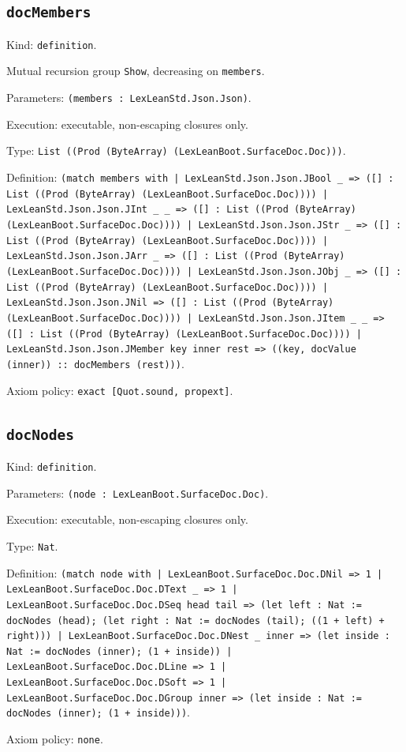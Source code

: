 \documentclass[11pt]{article}
\begin{document}
\subsection*{\texttt{docMembers}}
\noindent Kind: \texttt{definition}.\par
\noindent Mutual recursion group \texttt{Show}, decreasing on \texttt{members}.\par
\noindent Parameters: \texttt{(members : LexLeanStd.Json.Json)}.\par
\noindent Execution: executable, non-escaping closures only.\par
\noindent Type: \texttt{List ((Prod (ByteArray) (LexLeanBoot.SurfaceDoc.Doc)))}.\par
\noindent Definition: \texttt{(match members with | LexLeanStd.Json.Json.JBool \_ => ([] : List ((Prod (ByteArray) (LexLeanBoot.SurfaceDoc.Doc)))) | LexLeanStd.Json.Json.JInt \_ \_ => ([] : List ((Prod (ByteArray) (LexLeanBoot.SurfaceDoc.Doc)))) | LexLeanStd.Json.Json.JStr \_ => ([] : List ((Prod (ByteArray) (LexLeanBoot.SurfaceDoc.Doc)))) | LexLeanStd.Json.Json.JArr \_ => ([] : List ((Prod (ByteArray) (LexLeanBoot.SurfaceDoc.Doc)))) | LexLeanStd.Json.Json.JObj \_ => ([] : List ((Prod (ByteArray) (LexLeanBoot.SurfaceDoc.Doc)))) | LexLeanStd.Json.Json.JNil => ([] : List ((Prod (ByteArray) (LexLeanBoot.SurfaceDoc.Doc)))) | LexLeanStd.Json.Json.JItem \_ \_ => ([] : List ((Prod (ByteArray) (LexLeanBoot.SurfaceDoc.Doc)))) | LexLeanStd.Json.Json.JMember key inner rest => ((key, docValue (inner)) :: docMembers (rest)))}.\par
\noindent Axiom policy: \texttt{exact [Quot.sound, propext]}.\par
\subsection*{\texttt{docNodes}}
\noindent Kind: \texttt{definition}.\par
\noindent Parameters: \texttt{(node : LexLeanBoot.SurfaceDoc.Doc)}.\par
\noindent Execution: executable, non-escaping closures only.\par
\noindent Type: \texttt{Nat}.\par
\noindent Definition: \texttt{(match node with | LexLeanBoot.SurfaceDoc.Doc.DNil => 1 | LexLeanBoot.SurfaceDoc.Doc.DText \_ => 1 | LexLeanBoot.SurfaceDoc.Doc.DSeq head tail => (let left : Nat := docNodes (head); (let right : Nat := docNodes (tail); ((1 + left) + right))) | LexLeanBoot.SurfaceDoc.Doc.DNest \_ inner => (let inside : Nat := docNodes (inner); (1 + inside)) | LexLeanBoot.SurfaceDoc.Doc.DLine => 1 | LexLeanBoot.SurfaceDoc.Doc.DSoft => 1 | LexLeanBoot.SurfaceDoc.Doc.DGroup inner => (let inside : Nat := docNodes (inner); (1 + inside)))}.\par
\noindent Axiom policy: \texttt{none}.\par
\end{document}
